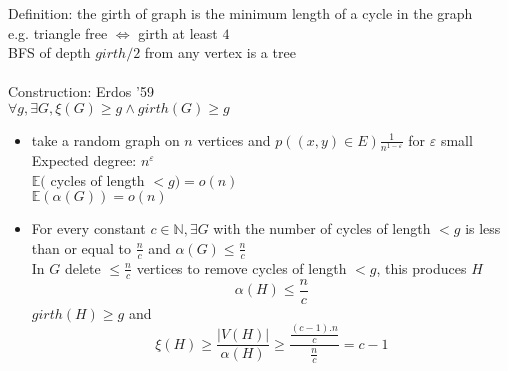 \documentclass[12pt]{article}
\begin{document}
Definition: the girth of graph is the minimum length of a cycle in the graph\\
e.g. triangle free $\Leftrightarrow$ girth at least $4$\\
BFS of depth $girth/2$ from any vertex is a tree\\\\

Construction: Erdos '59\\
$\forall  g, \exists G, \xi(G) \geqslant g \wedge girth(G) \geqslant g$\\
\begin{itemize}
\item take a random graph on $n$ vertices and $p \left( (x,y) \in E \right) \frac{1}{n^{1-\varepsilon}}$ for $\varepsilon$ small\\
	Expected degree: $n^\varepsilon$\\
	$\mathbb{E}($ cycles of length $< g) = o(n)$\\
	$\mathbb{E} \left( \alpha(G) \right) = o(n)$
\item For every constant $c \in \mathbb{N}, \exists G$ with the number of cycles of length $< g$ is less than or equal to $\frac{n}{c}$
	and $\alpha(G) \leqslant \frac{n}{c}$\\
	In $G$ delete $\leqslant \frac{n}{c}$ vertices to remove cycles of length $< g$, this produces $H$\\
	\[\alpha(H) \leqslant \frac{n}{c}\]
	$girth(H) \geqslant g$ and
	\[\xi(H) \geqslant \frac{|V(H)|}{\alpha(H)} \geqslant \frac{\frac{\left( c-1 \right) .n}{c}}{\frac{n}{c}} = c-1\]
\end{itemize}
\end{document}
